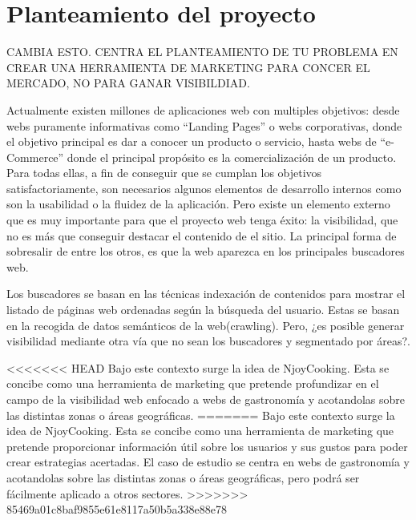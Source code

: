 \section{Planteamiento del proyecto}

CAMBIA ESTO. CENTRA EL PLANTEAMIENTO DE TU PROBLEMA EN CREAR UNA HERRAMIENTA DE MARKETING PARA CONCER EL MERCADO, NO PARA GANAR VISIBILDIAD.

Actualmente existen millones de aplicaciones web con multiples objetivos: desde webs puramente informativas como ``Landing Pages'' o webs
corporativas, donde el objetivo principal es dar a conocer un producto o servicio, hasta webs de ``e-Commerce'' donde el principal propósito es la comercialización de un producto. Para todas ellas, a fin de conseguir que se cumplan los objetivos satisfactoriamente, son necesarios algunos elementos de desarrollo internos como son la usabilidad o la fluidez de la aplicación. Pero existe un elemento externo que es muy importante para que el proyecto web tenga éxito: la visibilidad, que no es más que conseguir destacar el contenido de el sitio. La principal forma de sobresalir de entre los otros, es que la web aparezca en los principales buscadores web.

\vspace{5 mm}

Los buscadores se basan en las técnicas indexación de contenidos para mostrar el listado de páginas web ordenadas según la búsqueda del usuario.
Estas se basan en la recogida de datos semánticos de la web(crawling). Pero, ¿es posible generar visibilidad mediante otra vía que no sean los buscadores
y segmentado por áreas?.

\vspace{5 mm}

<<<<<<< HEAD
Bajo este contexto surge la idea de NjoyCooking. Esta se concibe como una herramienta de marketing que pretende profundizar en el campo de la visibilidad web enfocado a webs de gastronomía y acotandolas sobre las distintas zonas o áreas geográficas.
=======
Bajo este contexto surge la idea de NjoyCooking. Esta se concibe como una herramienta de
marketing que pretende proporcionar información útil sobre los usuarios y sus gustos para poder crear estrategias acertadas. El caso de estudio se centra en webs de gastronomía y acotandolas sobre las distintas zonas o áreas geográficas, pero podrá ser fácilmente aplicado a otros sectores.
>>>>>>> 85469a01c8baf9855e61e8117a50b5a338e88e78
